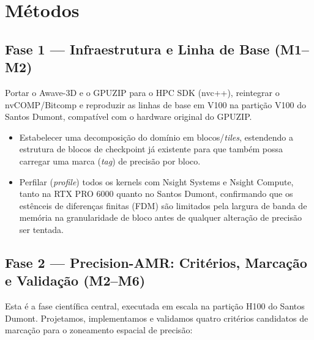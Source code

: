\documentclass[12pt,a4paper]{article}
\begin{document}
\section{Métodos}

\subsection{Fase 1 --- Infraestrutura e Linha de Base (M1--M2)}

Portar o Awave-3D e o GPUZIP para o HPC SDK (nvc++), reintegrar o
nvCOMP/Bitcomp e reproduzir as linhas de base em V100 na partição V100 do
Santos Dumont, compatível com o hardware original do GPUZIP.

\begin{itemize}
  \item Estabelecer uma decomposição do domínio em blocos/\emph{tiles},
        estendendo a estrutura de blocos de checkpoint já existente para que
        também possa carregar uma marca (\emph{tag}) de precisão por bloco.
  \item Perfilar (\emph{profile}) todos os kernels com Nsight Systems e Nsight
        Compute, tanto na RTX PRO 6000 quanto no Santos Dumont, confirmando
        que os estênceis de diferenças finitas (FDM) são limitados pela
        largura de banda de memória na granularidade de bloco antes de
        qualquer alteração de precisão ser tentada.
\end{itemize}

\subsection{Fase 2 --- Precision-AMR: Critérios, Marcação e Validação
(M2--M6)}

Esta é a fase científica central, executada em escala na partição H100 do
Santos Dumont. Projetamos, implementamos e validamos quatro critérios
candidatos de marcação para o zoneamento espacial de precisão:
\end{document}
